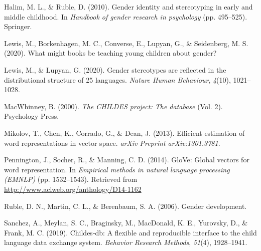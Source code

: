 \documentclass[10pt, letterpaper]{article}
\newenvironment{CSLReferences}%
  {}%
  {\par}
\begin{document}
\begin{CSLReferences}{1}{0}
\leavevmode{}%
Halim, M. L., \& Ruble, D. (2010). Gender identity and stereotyping in
early and middle childhood. In \emph{Handbook of gender research in
psychology} (pp. 495--525). Springer.

\leavevmode{}%
Lewis, M., Borkenhagen, M. C., Converse, E., Lupyan, G., \& Seidenberg,
M. S. (2020). What might books be teaching young children about gender?

\leavevmode{}%
Lewis, M., \& Lupyan, G. (2020). Gender stereotypes are reflected in the
distributional structure of 25 languages. \emph{Nature Human Behaviour},
\emph{4}(10), 1021--1028.

\leavevmode{}%
MacWhinney, B. (2000). \emph{The CHILDES project: The database} (Vol.
2). Psychology Press.

\leavevmode{}%
Mikolov, T., Chen, K., Corrado, G., \& Dean, J. (2013). Efficient
estimation of word representations in vector space. \emph{arXiv Preprint
arXiv:1301.3781}.

\leavevmode{}%
Pennington, J., Socher, R., \& Manning, C. D. (2014). GloVe: Global
vectors for word representation. In \emph{Empirical methods in natural
language processing (EMNLP)} (pp. 1532--1543). Retrieved from
\url{http://www.aclweb.org/anthology/D14-1162}

\leavevmode{}%
Ruble, D. N., Martin, C. L., \& Berenbaum, S. A. (2006). Gender
development.

\leavevmode{}%
Sanchez, A., Meylan, S. C., Braginsky, M., MacDonald, K. E., Yurovsky,
D., \& Frank, M. C. (2019). Childes-db: A flexible and reproducible
interface to the child language data exchange system. \emph{Behavior
Research Methods}, \emph{51}(4), 1928--1941.

\end{CSLReferences}


\end{document}
